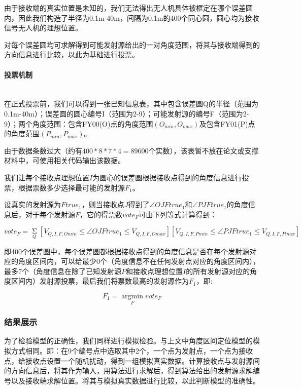 \documentclass{ctexart}
\newcommand{\subsubsubsection}[1]{\paragraph{#1}\mbox{}\\}
\begin{document}
  由于接收端的真实位置是未知的，我们无法得出无人机具体被框定在哪个误差圆内，因此我们构造了半径为0.1m-40m，间隔为0.1m的400个同心圆，圆心均为接收信号无人机的理想位置。

  对每个误差圆均可求解得到可能发射源给出的一对角度范围，将其与接收端得到的方向信息进行比较，以此为基础进行投票。

  \subsubsubsection{投票机制}

  在正式投票前，我们可以得到一张已知信息表，其中包含误差圆Q的半径（范围为0.1m-40m）；误差圆的圆心编号I（范围为2-9）；可能发射源的编号F（范围为2-9）；两个角度范围：包含FY00(O)点的角度范围$(O_{min},O_{max})$及包含FY01(P)点的角度范围$(P_{min},P_{max})$。

  由于数据条数过大（约有$400*8*7*4=89600$个实数），该表暂不放在论文或支撑材料中，可使用相关代码输出该数据。

  我们让每个接收点理想位置$I$为圆心的误差圆根据接收点得到的角度信息进行投票，根据票数多少选择最可能的发射源$F_1$。

  设真实的发射源为$Ftrue_1$，则当接收点$J$得到了$\angle OJFtrue_1$和$\angle PJFtrue_1$的角度信息后，对于每个发射源$F$，它的得票数$vote_F$可由下列等式计算得到：

  \begin{equation}
  vote_F=\mathop{\Sigma}\limits_{Q} [V_{Q,I,F,Omin} \le \angle OJFtrue_1 \le V_{Q,I,F,Omax}][V_{Q,I,F,Pmin} \le \angle PJFtrue_1 \le V_{Q,I,F,Pmax}]
\end{equation}


  即400个误差圆中，每个误差圆都根据接收点得到的角度信息是否在每个发射源对应的角度区间内，可以给最少$0$个（角度信息不在任何发射点对应的角度区间内），最多$7$个（角度信息在除了已知发射源$P$和接收点理想位置$I$的所有发射源对应的角度区间内）发射源投票，最后我们将票数最高的发射源作为$F_1$，即:

  \begin{equation}
F_1=\mathop{\arg\min}\limits_{F} vote_F
\end{equation}




  \subsubsection{结果展示}

  为了检验模型的正确性，我们同样进行模拟检验。与上文中角度区间定位模型的模拟方式相同。即：在9个编号点中选取其中2个，一个点为发射点，一个点为接收点，给接收点设置一个随机扰动，得到一组模拟真实数据。计算接收点与发射源间的方向信息后，将其作为输入，用算法进行求解后，得到算法给出的发射源求解编号以及接收端求解位置。将其与模拟真实数据进行比较，以此判断模型的准确性。
\end{document}
